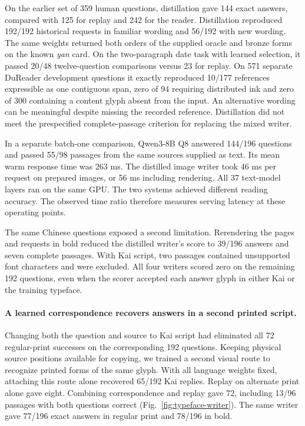 \documentclass[12pt,a4paper]{article}
\providecommand{\DIFadd}[1]{{\protect\color{blue} \sf #1}} %
\begin{document}
\DIFadd{On the earlier set of 359 human questions, distillation gave 144 exact answers, compared with 125 for replay and 242 for the reader. Distillation reproduced 192/192 historical requests in familiar wording and 56/192 with new wording. The same weights returned both orders of the supplied oracle and bronze forms on the known \textit{yan} card. On the two-paragraph date task with learned selection, it passed 20/48 twelve-question comparisons versus 23 for replay. On 571 separate DuReader development questions it exactly reproduced 10/177 references expressible as one contiguous span, zero of 94 requiring distributed ink and zero of 300 containing a content glyph absent from the input. An alternative wording can be meaningful despite missing the recorded reference. Distillation did not meet the prespecified complete-passage criterion for replacing the mixed writer.
}

\DIFadd{In a separate batch-one comparison, Qwen3-8B Q8 answered 144/196 questions and passed 55/98 passages from the same sources supplied as text. Its mean warm response time was 263 ms. The distilled image writer took 46 ms per request on prepared images, or 56 ms including rendering. All 37 text-model layers ran on the same GPU. The two systems achieved different reading accuracy. The observed time ratio therefore measures serving latency at these operating points.
}

\DIFadd{The same Chinese questions exposed a second limitation. Rerendering the pages and requests in bold reduced the distilled writer's score to 39/196 answers and seven complete passages. With Kai script, two passages contained unsupported font characters and were excluded. All four writers scored zero on the remaining 192 questions, even when the scorer accepted each answer glyph in either Kai or the training typeface.
}

\paragraph{\DIFadd{A learned correspondence recovers answers in a second printed script.}}
\DIFadd{Changing both the question and source to Kai script had eliminated all 72 regular-print successes on the corresponding 192 questions. Keeping physical source positions available for copying, we trained a second visual route to recognize printed forms of the same glyph. With all language weights fixed, attaching this route alone recovered 65/192 Kai replies. Replay on alternate print alone gave eight. Combining correspondence and replay gave 72, including 13/96 passages with both questions correct (Fig.~\ref{fig:typeface-writer}). The same writer gave 77/196 exact answers in regular print and 78/196 in bold.
}
\end{document}
